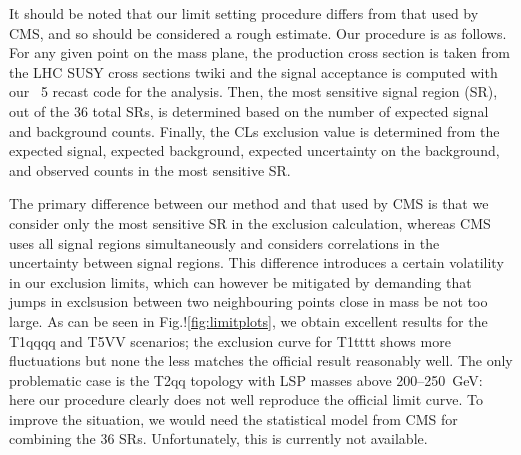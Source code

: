 It should be noted that our limit setting procedure differs from that used by CMS, and so should be 
considered a rough estimate. Our procedure is as follows. For any given point
on the mass plane, the production cross section is taken from the LHC SUSY cross sections twiki 
and the signal acceptance is computed with our {}~5 recast code for the analysis.
Then, the most sensitive signal region (SR), out of the 36 total SRs, is determined based on the 
number of expected signal and background counts. 
Finally, the CLs exclusion value is determined from the expected signal, expected
background, expected uncertainty on the background, and observed counts in the most sensitive
SR. 

The primary difference between our method and that used by CMS is that we consider only the most sensitive SR
in the exclusion calculation, whereas CMS uses all signal regions simultaneously and considers correlations
in the uncertainty between signal regions. This difference introduces a certain volatility in our  
exclusion limits, which can however be mitigated by demanding that jumps in exclsusion between two 
neighbouring points close in mass be not too large. 
As can be seen in Fig.!\ref{fig:limitplots}, we obtain excellent results for the T1qqqq and T5VV scenarios; the 
exclusion curve for T1tttt shows more fluctuations but none the less matches the official result reasonably well. 
The only problematic case is the T2qq topology with LSP masses above 200--250~GeV: here our procedure 
clearly does not well reproduce the official limit curve. To improve the situation, we would need the  
statistical model from CMS for combining  the 36 SRs. Unfortunately, this is currently not available.   

